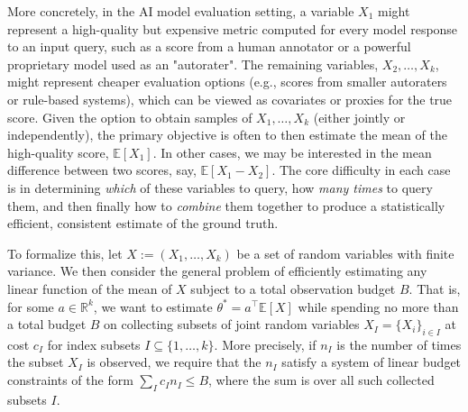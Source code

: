 \documentclass{article} %
\newcommand{\Ex}{\mathbb{E}}
\newcommand{\alekh}[1]{ {\color{brown}[AA: #1]}}
\begin{document}
More concretely, in the AI model evaluation setting, a variable $X_1$ might represent a high-quality but expensive metric computed for every model response to an input query, such as a score from a human annotator or a powerful proprietary model used as an "autorater". The remaining variables, $X_2, \ldots, X_k$,  might represent cheaper evaluation options (e.g., scores from smaller autoraters or rule-based systems), which can be viewed as covariates or proxies for the true score. Given the option to obtain samples of $X_1, \ldots, X_k$ (either jointly or independently), the primary objective is  often to then estimate the mean of the high-quality score, $\Ex[X_1]$. In other cases, we may be interested in the mean difference between two scores, say, $\Ex[X_1-X_2]$. The core difficulty in each case is in determining \emph{which} of these variables to query, how \emph{many times} to query them, and then finally how to \emph{combine} them together to produce a statistically efficient, consistent estimate of the ground truth.

To formalize this, let $X := (X_1, \ldots, X_k)$ be a set of random variables with finite variance. We then consider the general problem of efficiently estimating any linear function of the mean of $X$ subject to a total observation budget $B$. That is, for some $a \in \mathbb{R}^k$, we want to estimate $\theta^* = a^\top \Ex [X]$ while spending no more than a total budget $B$ on collecting subsets of joint random variables $X_I = \{X_i\}_{i\in I}$ at cost $c_I$ for index subsets $I \subseteq \{1, \ldots, k\}$. More precisely, if $n_I$ is the number of times the subset $X_I$ is observed, we require that the $n_I$ satisfy a system of linear budget constraints of the form $\sum_{I} c_I n_I \leq B$, where the sum is over all such collected subsets $I$. %
\end{document}
